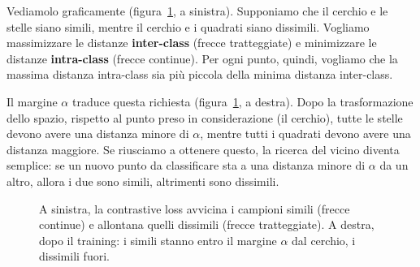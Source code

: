 Vediamolo graficamente (figura~\ref{fig:contrastive}, a sinistra). Supponiamo che il cerchio e le stelle siano simili, mentre il cerchio e i quadrati siano dissimili. Vogliamo massimizzare le distanze \textbf{inter-class} (frecce tratteggiate) e minimizzare le distanze \textbf{intra-class} (frecce continue). Per ogni punto, quindi, vogliamo che la massima distanza intra-class sia più piccola della minima distanza inter-class.

Il margine $\alpha$ traduce questa richiesta (figura~\ref{fig:contrastive}, a destra). Dopo la trasformazione dello spazio, rispetto al punto preso in considerazione (il cerchio), tutte le stelle devono avere una distanza minore di $\alpha$, mentre tutti i quadrati devono avere una distanza maggiore. Se riusciamo a ottenere questo, la ricerca del vicino diventa semplice: se un nuovo punto da classificare sta a una distanza minore di $\alpha$ da un altro, allora i due sono simili, altrimenti sono dissimili.

\begin{figure}[htbp]
\centering
{}
\caption{A sinistra, la contrastive loss avvicina i campioni simili (frecce continue) e allontana quelli dissimili (frecce tratteggiate). A destra, dopo il training: i simili stanno entro il margine $\alpha$ dal cerchio, i dissimili fuori.}
\label{fig:contrastive}
\end{figure}

